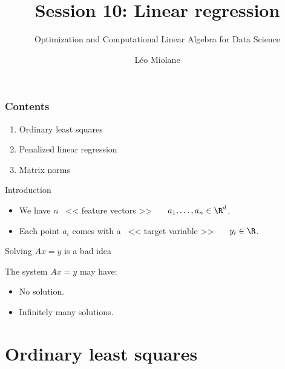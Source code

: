 \documentclass{beamer}
\title{Session 10: Linear regression}
\subtitle{Optimization and Computational Linear Algebra for Data Science}
\author{Léo Miolane}
\date{}
\begin{document}
\setcounter{showProgressBar}{0}
\setcounter{showSlideNumbers}{0}

\frame{\titlepage}
\setcounter{framenumber}{0}
\setcounter{showSlideNumbers}{1}

\begin{frame}
	\frametitle{Contents}
	\begin{enumerate}
		\item Ordinary least squares
		\item Penalized linear regression
		\item Matrix norms
	\end{enumerate}
\end{frame}

\begin{frame}[t]{Introduction}
	\grid

	\vspace{-0.2cm}
	\begin{itemize}
		\item We have $n$  \ << feature vectors >> \ \ \ $a_1, \dots, a_n \in \R^d$.
		\item Each point $a_i$ comes with a \ << target variable >> \ \ \ $y_i \in \R$.
	\end{itemize}

\end{frame}


\begin{frame}[t]{Solving $Ax=y$ is a bad idea}
	\grid

	The system $Ax = y$ may have:
	\begin{itemize}
		\item No solution.
			\vspace{3cm}
		\item Infinitely many solutions.
	\end{itemize}

\end{frame}

\section{Ordinary least squares}
\end{document}
